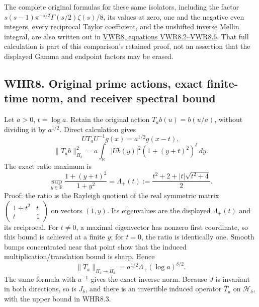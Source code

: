 The complete original formulas for these same isolators, including the
factor \(s(s-1)\pi^{-s/2}\Gamma(s/2)\zeta(s)/8\), its values at zero,
one and the negative even integers, every reciprocal Taylor coefficient,
and the unshifted inverse Mellin integral, are also written out in
\href{https://github.com/KokunoYumeto/zeta-function-research-reader/blob/main/workbenches/splitzero-tandem/continuations/20260925-full-source-tensor-and-original-divisor/counterfactual/FULL_VERTICAL_WEIGHT_RETURN.md}{VWR8,
equations VWR8.2--VWR8.6}. That full calculation is part of this
comparison's retained proof, not an assertion that the displayed Gamma
and endpoint factors may be erased.

\subsection{WHR8. Original prime actions, exact finite-time norm, and
receiver spectral
bound}\label{whr8.-original-prime-actions-exact-finite-time-norm-and-receiver-spectral-bound}

Let \(a>0\), \(t=\log a\). Retain the original action
\(T_ab(u)=b(u/a)\), without dividing it by \(a^{1/2}\). Direct
calculation gives \[
 U T_a U^{-1}g(x)=a^{1/2}g(x-t),
\] \[
 \|T_ab\|_{H_\delta}^2
 =a\int_{\mathbb R}|Ub(y)|^2(1+(y+t)^2)^\delta\,dy.
 \tag{WHR8.1}
\] The exact ratio maximum is \[
 \sup_{y\in\mathbb R}\frac{1+(y+t)^2}{1+y^2}
 =\Lambda_+(t):=
 \frac{t^2+2+|t|\sqrt{t^2+4}}2.
 \tag{WHR8.2}
\] Proof: the ratio is the Rayleigh quotient of the real symmetric
matrix \(\left(\begin{smallmatrix}1+t^2&t\\t&1\end{smallmatrix}\right)\)
on vectors \((1,y)\). Its eigenvalues are the displayed \(\Lambda_+(t)\)
and its reciprocal. For \(t\ne0\), a maximal eigenvector has nonzero
first coordinate, so this bound is achieved at a finite \(y\); for
\(t=0\), the ratio is identically one. Smooth bumps concentrated near
that point show that the induced multiplication/translation bound is
sharp. Hence \[
 \boxed{\|T_a\|_{H_\delta\to H_\delta}
        =a^{1/2}\Lambda_+(\log a)^{\delta/2}.}
 \tag{WHR8.3}
\] The same formula with \(a^{-1}\) gives the exact inverse norm.
Because \(J\) is invariant in both directions, so is \(J_\delta\), and
there is an invertible induced operator \(\overline T_a\) on
\(\mathcal H_\delta\), with the upper bound in WHR8.3.

